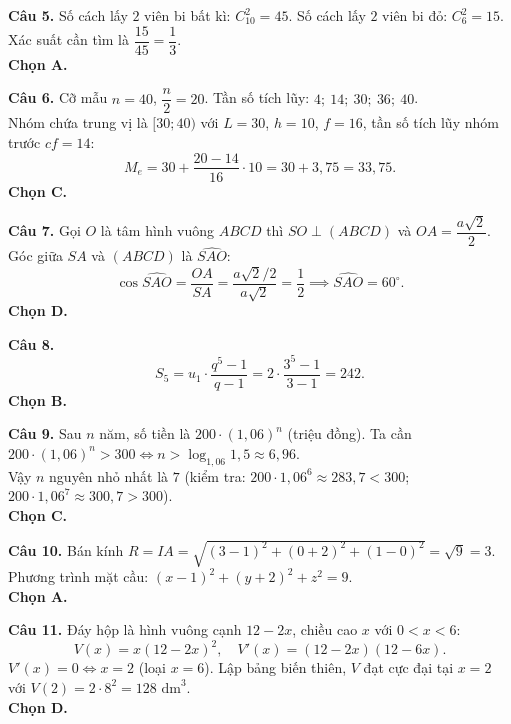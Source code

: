 \documentclass[12pt,a4paper]{article}
\begin{document}
\vspace{0.25cm}
\noindent\textbf{Câu 5.} Số cách lấy $2$ viên bi bất kì: $C_{10}^2 = 45$. Số cách lấy $2$ viên bi đỏ: $C_6^2 = 15$.\\
Xác suất cần tìm là $\dfrac{15}{45} = \dfrac{1}{3}$.\\
\textbf{Chọn A.}

\vspace{0.25cm}
\noindent\textbf{Câu 6.} Cỡ mẫu $n = 40$, $\dfrac{n}{2} = 20$. Tần số tích lũy: $4;\ 14;\ 30;\ 36;\ 40$.\\
Nhóm chứa trung vị là $[30; 40)$ với $L = 30$, $h = 10$, $f = 16$, tần số tích lũy nhóm trước $cf = 14$:
\[
M_e = 30 + \dfrac{20 - 14}{16}\cdot 10 = 30 + 3{,}75 = 33{,}75.
\]
\textbf{Chọn C.}

\vspace{0.25cm}
\noindent\textbf{Câu 7.} Gọi $O$ là tâm hình vuông $ABCD$ thì $SO \perp (ABCD)$ và $OA = \dfrac{a\sqrt{2}}{2}$. Góc giữa $SA$ và $(ABCD)$ là $\widehat{SAO}$:
\[
\cos\widehat{SAO} = \dfrac{OA}{SA} = \dfrac{a\sqrt{2}/2}{a\sqrt{2}} = \dfrac{1}{2} \implies \widehat{SAO} = 60^\circ.
\]
\textbf{Chọn D.}

\vspace{0.25cm}
\noindent\textbf{Câu 8.}
\[
S_5 = u_1 \cdot \dfrac{q^5 - 1}{q - 1} = 2\cdot \dfrac{3^5 - 1}{3 - 1} = 242.
\]
\textbf{Chọn B.}

\vspace{0.25cm}
\noindent\textbf{Câu 9.} Sau $n$ năm, số tiền là $200\cdot (1{,}06)^n$ (triệu đồng). Ta cần $200\cdot (1{,}06)^n > 300 \iff n > \log_{1{,}06} 1{,}5 \approx 6{,}96$.\\
Vậy $n$ nguyên nhỏ nhất là $7$ (kiểm tra: $200\cdot 1{,}06^6 \approx 283{,}7 < 300$; $200\cdot 1{,}06^7 \approx 300{,}7 > 300$).\\
\textbf{Chọn C.}

\vspace{0.25cm}
\noindent\textbf{Câu 10.} Bán kính $R = IA = \sqrt{(3 - 1)^2 + (0 + 2)^2 + (1 - 0)^2} = \sqrt{9} = 3$. Phương trình mặt cầu: $(x - 1)^2 + (y + 2)^2 + z^2 = 9$.\\
\textbf{Chọn A.}

\vspace{0.25cm}
\noindent\textbf{Câu 11.} Đáy hộp là hình vuông cạnh $12 - 2x$, chiều cao $x$ với $0 < x < 6$:
\[
V(x) = x(12 - 2x)^2, \quad V'(x) = (12 - 2x)(12 - 6x).
\]
$V'(x) = 0 \iff x = 2$ (loại $x = 6$). Lập bảng biến thiên, $V$ đạt cực đại tại $x = 2$ với $V(2) = 2\cdot 8^2 = 128\text{ dm}^3$.\\
\textbf{Chọn D.}
\end{document}
